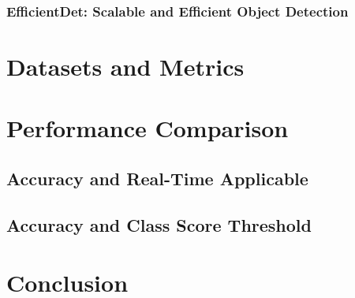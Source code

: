 \documentclass[12pt, oneside]{article}
\begin{document}
\subsubsection{EfficientDet: Scalable and Efficient Object Detection}


\section{Datasets and Metrics}


\section{Performance Comparison}


\subsection{Accuracy and Real-Time Applicable}


\subsection{Accuracy and Class Score Threshold}


\section{Conclusion}


\newpage

\printbibliography
\end{document}
